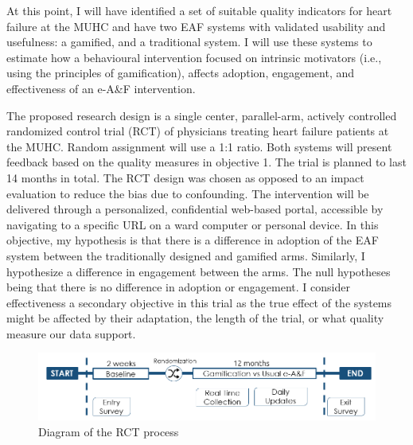 At this point, I will have identified a set of suitable quality indicators for heart failure at the MUHC and have two \gls{EAF} systems with validated usability and usefulness: a gamified, and a traditional system. I will use these systems to estimate how a behavioural intervention focused on intrinsic motivators (i.e., using the principles of gamification), affects adoption, engagement, and effectiveness of an e-A\&F intervention.

The proposed research design is a single center, parallel-arm, actively controlled randomized control trial (\gls{RCT}) of physicians treating heart failure patients at the \gls{MUHC}. Random assignment will use a 1:1 ratio. Both systems will present feedback based on the quality measures in objective 1. The trial is planned to last 14 months in total. The RCT design was chosen as opposed to an impact evaluation to reduce the bias due to confounding. The intervention will be delivered through a personalized, confidential web-based portal, accessible by navigating to a specific URL on a ward computer or personal device. In this objective, my hypothesis is that there is a difference in adoption of the \gls{EAF} system between the traditionally designed and gamified arms. Similarly, I hypothesize a difference in engagement between the arms. The null hypotheses being that there is no difference in adoption or engagement. I consider effectiveness a secondary objective in this trial as the true effect of the systems might be affected by their adaptation, the length of the trial, or what quality measure our data support.

\begin{figure}[h]
    \vspace{-2mm}
    \centering
    \includegraphics[width=\textwidth]{img/rct_flow_corrected.png}
    \caption{Diagram of the RCT process}
    \label{fig:rct_flow}
    \vspace{-5mm}
\end{figure}

